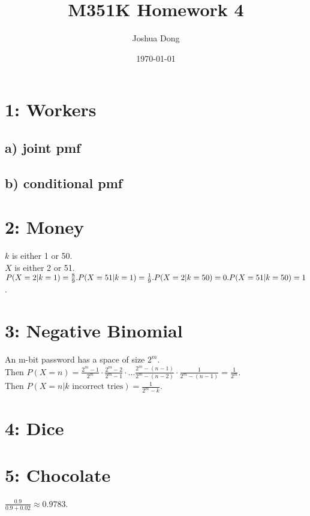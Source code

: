 \documentclass{article}
\begin{document}
\title{\vspace{-60px}M351K\: Homework 4}
\author{Joshua Dong}
\date{\today}
\maketitle

\section*{1: Workers}
\subsection*{a) joint pmf}
\vspace{100mm}
\subsection*{b) conditional pmf}
\newpage

\section*{2: Money}
$k$ is either 1 or 50.
\\$X$ is either 2 or 51.
\\$P(X=2|k=1) = \frac{8}{9}.
\\P(X=51|k=1) = \frac{1}{9}.
\\P(X=2|k=50) = 0.
\\P(X=51|k=50) = 1$.

\section*{3: Negative Binomial}
An m-bit password has a space of size $2^m$.
\\Then $P(X=n) =
\frac{2^m - 1}{2^m} \cdot
\frac{2^m - 2}{2^m - 1} \cdot ... 
\frac{2^m - (n-1)}{2^m - (n-2)} \cdot
\frac{1}{2^m - (n-1)}
= \frac{1}{2^m}$.
\\Then $P(X=n|k \text{ incorrect tries})
= \frac{1}{2^m - k}$.

\section*{4: Dice}
\newpage

\section*{5: Chocolate}
$\frac{0.9}{0.9 + 0.02} \approx 0.9783$.
\end{document}
